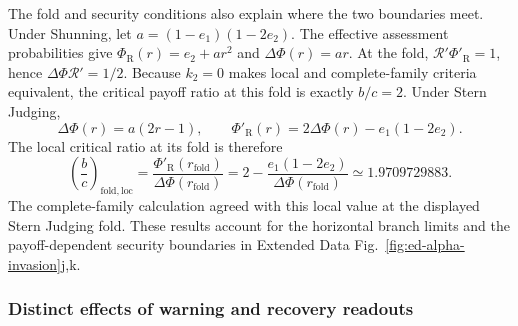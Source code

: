 \documentclass[fleqn,10pt]{wlscirep}
\begin{document}
The fold and security conditions also explain where the two boundaries meet. Under Shunning, let $a=(1-e_1)(1-2e_2)$. The effective assessment probabilities give $\Phi_{\mathrm R}(r)=e_2+ar^2$ and $\Delta\Phi(r)=ar$. At the fold, $\mathcal R'\Phi'_{\mathrm R}=1$, hence $\Delta\Phi\mathcal R'=1/2$. Because $k_2=0$ makes local and complete-family criteria equivalent, the critical payoff ratio at this fold is exactly $b/c=2$. Under Stern Judging,
\begin{equation}
\Delta\Phi(r)=a(2r-1),\qquad
\Phi'_{\mathrm R}(r)=2\Delta\Phi(r)-e_1(1-2e_2).
\end{equation}
The local critical ratio at its fold is therefore
\begin{equation}
\left(\frac bc\right)_{\mathrm{fold,loc}}
=\frac{\Phi'_{\mathrm R}(r_{\mathrm{fold}})}{\Delta\Phi(r_{\mathrm{fold}})}
=2-\frac{e_1(1-2e_2)}{\Delta\Phi(r_{\mathrm{fold}})}
\simeq1.9709729883.
\label{eq:si-readout-fold-critical-bc}
\end{equation}
The complete-family calculation agreed with this local value at the displayed Stern Judging fold. These results account for the horizontal branch limits and the payoff-dependent security boundaries in Extended Data Fig.~\ref{fig:ed-alpha-invasion}j,k.

\subsubsection{Distinct effects of warning and recovery readouts}
\label{sec:si-readout-beta}
\end{document}
